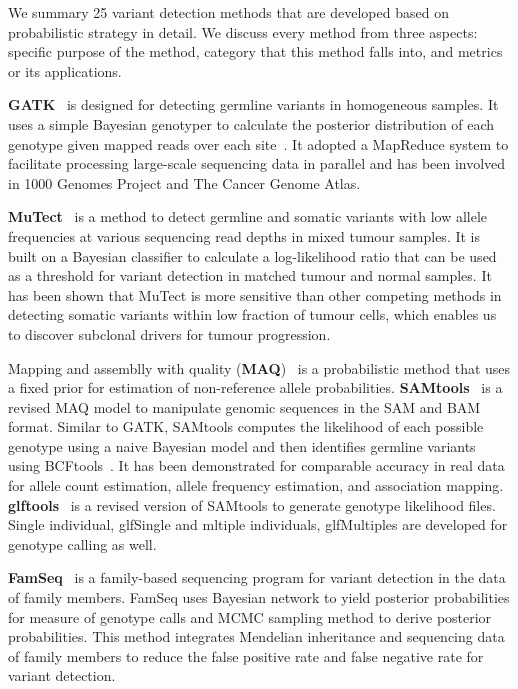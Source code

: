 \documentclass[a4,center,fleqn]{NAR}
\begin{document}
We summary 25 variant detection methods that are developed based on probabilistic strategy in detail.
We discuss every method from three aspects: specific purpose of the method, category that this method falls into, and metrics or its applications.

\textbf{GATK}~\citep{McKenna2010} is designed for detecting germline variants in homogeneous samples.
It uses a simple Bayesian genotyper to calculate the posterior distribution of each genotype given mapped reads over each site~\citep{depristo2011framework}.
It adopted a MapReduce system to facilitate processing large-scale sequencing data in parallel and has been involved in 1000 Genomes Project and The Cancer Genome Atlas.

\textbf{MuTect}~\citep{Cibulskis2013} is a method to detect germline and somatic variants with low allele frequencies at various sequencing read depths in mixed tumour samples.
It is built on a Bayesian classifier to calculate a log-likelihood ratio that can be used as a threshold for variant detection in matched tumour and normal samples.
It has been shown that MuTect is more sensitive than other competing methods in detecting somatic variants within low fraction of tumour cells, which enables us to discover subclonal drivers for tumour progression.

Mapping and assemblly with quality (\textbf{MAQ})~\citep{Li2008} is a probabilistic method that uses a fixed prior for estimation of non-reference allele probabilities.
\textbf{SAMtools}~\citep{Li2009a} is a revised MAQ model to manipulate genomic sequences in the SAM and BAM format.
Similar to GATK, SAMtools computes the likelihood of each possible genotype using a naive Bayesian model and then identifies germline variants using BCFtools~\citep{li2011statistical}.
It has been demonstrated for comparable accuracy in real data for allele count estimation, allele frequency estimation, and association mapping.
\textbf{glftools}~\citep{abecasis2010} is a revised version of SAMtools to generate genotype likelihood files.
Single individual, glfSingle and mltiple individuals, glfMultiples are developed for genotype calling as well.

\textbf{FamSeq}~\citep{Peng2013} is a family-based sequencing program for variant detection in the data of family members.
FamSeq uses Bayesian network to yield posterior probabilities for measure of genotype calls and MCMC sampling method to derive posterior probabilities.
This method integrates Mendelian inheritance and sequencing data of family members to reduce the false positive rate and false negative rate for variant detection.
\end{document}
